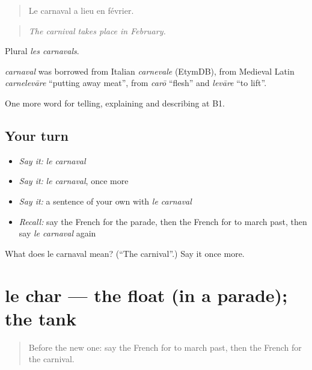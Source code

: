 \begin{quote}
Le carnaval a lieu en février.
\end{quote}

\begin{quote}
\emph{The carnival takes place in February.}
\end{quote}

Plural \emph{les carnavals}.

\begin{cousinweb}
\emph{carnaval} was borrowed from Italian \emph{carnevale} (EtymDB), from Medieval Latin \emph{carnelevāre} \textquotedblleft{}putting away meat\textquotedblright{}, from \emph{carō} \textquotedblleft{}flesh\textquotedblright{} and \emph{levāre} \textquotedblleft{}to lift\textquotedblright{}.
\end{cousinweb}

\begin{grammarlens}[title={What you've built}]
One more word for telling, explaining and describing at B1.
\end{grammarlens}

\subsection*{Your turn}
\begin{itemize}
\raggedright
  \item \emph{Say it:} \emph{le carnaval}
  \item \emph{Say it:} \emph{le carnaval}, once more
  \item \emph{Say it:} a sentence of your own with \emph{le carnaval}
  \item \emph{Recall:} say the French for the parade, then the French for to march past, then say \emph{le carnaval} again
\end{itemize}

\begin{tcolorbox}[breakable,colback=teal!4,colframe=teal!35!black,title={Before you move on}]
What does le carnaval mean? (\textquotedblleft{}The carnival\textquotedblright{}.) Say it once more.
\end{tcolorbox}
\section[le char]{le char — the float (in a parade); the tank}

\label{lesson:FR-C317-char}



\begin{quote}
Before the new one: say the French for to march past, then the French for the carnival.
\end{quote}

